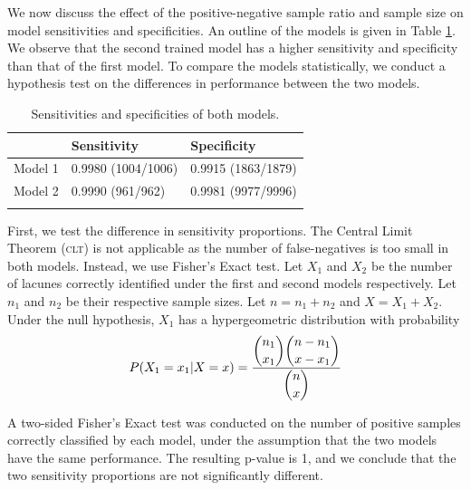 We now discuss the effect of the positive-negative sample ratio and sample size on model sensitivities and specificities. An outline of the models is given in Table \ref{results-sens-spec-tab}. We observe that the second trained model has a higher sensitivity and specificity than that of the first model. To compare the models statistically, we conduct a hypothesis test on the differences in performance between the two models.

\begin{table}[ht]
	\centering
	\begin{tabular}{@{}lll@{}}
	\toprule[1.5pt]
	& Sensitivity & Specificity\\
	\midrule
	Model 1 & 0.9980 (1004/1006) & 0.9915 (1863/1879)\\
	Model 2 & 0.9990 (961/962) & 0.9981 (9977/9996)\\
	\bottomrule[1.5pt]\\
	\end{tabular}
	\caption{\small{Sensitivities and specificities of both models.}}
	\label{results-sens-spec-tab}
\end{table}

First, we test the difference in sensitivity proportions. The Central Limit Theorem (\textsc{clt}) is not applicable as the number of false-negatives is too small in both models. Instead, we use Fisher's Exact test. Let $X_1$ and $X_2$ be the number of lacunes correctly identified under the first and second models respectively. Let $n_1$ and $n_2$ be their respective sample sizes. Let $n = n_1 + n_2$ and $X = X_1 + X_2$. Under the null hypothesis, $X_1$ has a hypergeometric distribution with probability
\begin{align*}
	P(X_1 = x_1|X = x) = \dfrac{\dbinom{n_1}{x_1}\dbinom{n-n_1}{x - x_1}}{\dbinom{n}{x}}
\end{align*}

A two-sided Fisher's Exact test was conducted on the number of positive samples correctly classified by each model, under the assumption that the two models have the same performance. The resulting p-value is 1, and we conclude that the two sensitivity proportions are not significantly different.

